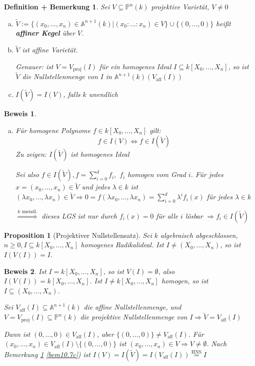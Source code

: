 \documentclass[a4paper, 12pt, numbers=noendperiod, chapterprefix=true]{scrbook}
\theoremstyle{break}
\newtheorem{DefBem}[Def]{Definition + Bemerkung}
\newtheorem{Prop}[Def]{Proposition}
\theoremstyle{nonumberbreak}
\newtheorem{Bew}{Beweis}
\theoremstyle{nonumberplain}
\newcommand{\emp}[1]{\textbf{\emph{#1}}}
\newcommand{\deftermspec}[2]{{\index{#2}}\emp{#1}}
\newcommand{\Sum}{\sum\limits}
\newcommand{\A}{\mathbb{A}}
\newcommand{\IP}{\mathbb{P}}%
\begin{document}
\begin{DefBem}\label{bem10.7}
Sei $V\subseteq \IP^n(k)$ projektive Variet\"at, $V\ne0$
\begin{enumerate}[a)]
\item
	$\widetilde V:=\{(x_0,\ldots ,x_n)\in \A^{n+1}(k)|(x_0:\ldots :x_n)\in V\}\cup\{(0,\ldots ,0)\}$ hei\ss t \deftermspec{affiner Kegel}{Kegel!affiner} \"uber $V$.

\item
	$\widetilde V$ ist affine Variet\"at.
	
	\emph{Genauer:} ist $V=V_{\text{proj}}(I)$ f\"ur ein homogenes Ideal $I\subseteq k[X_0,\ldots ,X_n]$, so ist $\widetilde V$ die Nullstellenmenge von $I$ in $\A^{n+1}(k)(V_{\text{aff}}(I))$
\item\label{bem10.7c}
	$I(\widetilde V)=I(V)$, falls $k$ unendlich
\end{enumerate}\end{DefBem}

\begin{Bew}\begin{enumerate}[a)]\item[c)]
F\"ur homogene Polynome $f\in k[X_0,\ldots ,X_n]$ gilt:
	\[f\in I(V) \Leftrightarrow f\in I(\widetilde V)\]
\emph{Zu zeigen:} $I(\widetilde V)$ ist homogenes Ideal

Sei also $f\in I(\widetilde V), f=\Sum_{i=0}^d f_i,$ $f_i$ homogen vom Grad $i$. F\"ur jedes $x=(x_0,\ldots ,x_n) \in \widetilde V$ und jedes $\lambda\in k$ ist $(\lambda x_0,\ldots ,\lambda x_n)\in \widetilde V \Rightarrow 0=f(\lambda x_0,\ldots ,\lambda x_n)= \Sum_{i=0}^d\lambda^if_i(x)$ f\"ur jedes $\lambda\in k$

$\overset{k\text{ unendl.}}{\Longrightarrow} $ dieses LGS ist nur durch $f_i(x)=0$ f\"ur alle $i$ l\"osbar $\Rightarrow f_i\in I(\widetilde V)$
\end{enumerate}\end{Bew}

\begin{Prop}[Projektiver Nullstellensatz]
Sei $k$ algebraisch abgeschlossen, $n\ge0, I\subseteq k[X_0,\ldots ,X_n]$ homogenes Radikalideal. Ist $I\not=(X_0,\ldots ,X_n)$, so ist $I(V(I))=I$.
\end{Prop}

\begin{Bew}
Ist $I=k[X_0,\ldots ,X_n]$, so ist $V(I)=\emptyset$, also $I(V(I))=k[X_0,\ldots ,X_n]$. Ist $I\not= k[X_0,\ldots ,X_n]$ homogen, so ist $I\subseteq(X_0,\ldots ,X_n)$.

Sei $V_{\text{aff}}(I)\subseteq\A^{n+1}(k)$ die affine Nullstellenmenge, und $V=V_{\text{proj}}(I)\subseteq\IP^n(k)$ die projektive Nullstellenmenge von $I \Rightarrow \widetilde V =V_{\text{aff}}(I)$

Dann ist $(0,\ldots ,0)\in V_{\text{aff}}(I)$, aber $\{(0,\ldots ,0)\}\not=V_{\text{aff}}(I)$. F\"ur $(x_0,\ldots ,x_n)\in V_{\text{aff}}(I)\setminus\{(0,\ldots ,0)\}$ ist $(x_0,\ldots ,x_n)\in V\Rightarrow V\not= \emptyset$. Nach Bemerkung \ref{bem10.7} \ref{bem10.7c}) ist $I(V)=I(\widetilde V)=I(V_{\text{aff}}(I)) \overset{\text{HNS}}{=} I$
\end{Bew}
\end{document}
